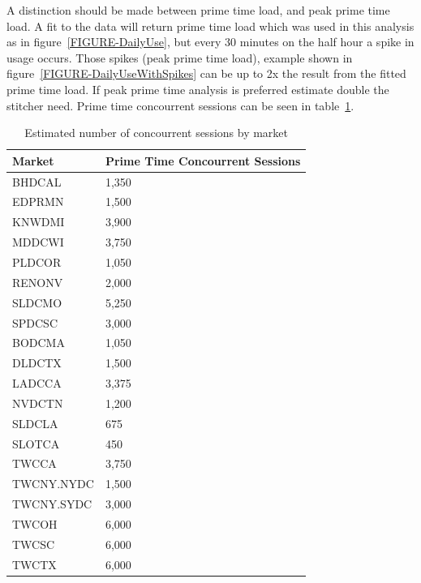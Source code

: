 \documentclass{article}
\begin{document}
A distinction should be made between prime time load, and peak prime time load. A fit to the data will return prime time load which was used in this analysis as in figure~\ref{FIGURE-DailyUse}, but every 30 minutes on the half hour a spike in usage occurs. Those spikes (peak prime time load), example shown in figure~\ref{FIGURE-DailyUseWithSpikes} can be up to 2x the result from the fitted prime time load. If peak prime time analysis is preferred estimate double the stitcher need. Prime time concourrent sessions can be seen in table~\ref{TABLE-marketConcSessions}.

\begin{table}
\begin{tabular}{|l|l|} 
\hline Market & Prime Time Concourrent Sessions \\
\hline BHDCAL & 1,350 \\
\hline EDPRMN & 1,500 \\
\hline KNWDMI & 3,900 \\
\hline MDDCWI & 3,750 \\
\hline PLDCOR & 1,050 \\
\hline RENONV & 2,000 \\
\hline SLDCMO & 5,250 \\
\hline SPDCSC & 3,000 \\
\hline BODCMA & 1,050 \\
\hline DLDCTX & 1,500 \\
\hline LADCCA & 3,375 \\
\hline NVDCTN & 1,200 \\
\hline SLDCLA & 675 \\
\hline SLOTCA & 450 \\
\hline TWCCA & 3,750 \\
\hline TWCNY.NYDC & 1,500 \\
\hline TWCNY.SYDC & 3,000 \\
\hline TWCOH & 6,000 \\
\hline TWCSC & 6,000 \\
\hline TWCTX & 6,000 \\
\hline 
\end{tabular}
\caption{\label{TABLE-marketConcSessions}Estimated number of concourrent sessions by market}
\end{table}
\end{document}
